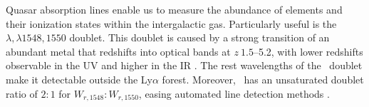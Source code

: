 \documentclass[fleqn,usenatbib]{mnras}
\newcommand{\civ}{\ion{C}{IV}}
\begin{document}
Quasar absorption lines enable %
us to measure the abundance of elements and their ionization states
within the intergalactic gas.
Particularly useful is the \civ\ $\lambda,\lambda1548,1550$ %
doublet.
This doublet is caused by a strong transition of an abundant metal that
redshifts into optical bands at  $z ~ 1.5$--5.2, with lower redshifts observable in the UV \citep[e.g.,][]{C10,shul2014} and higher in the IR \citep[e.g.,][]{simcoeetal13,ryanweber09,beckeretal09}. %
The rest wavelengths of the \civ\ doublet make it
detectable outside the  Ly$\alpha$ forest.
Moreover, \civ\ has an unsaturated doublet
ratio of $2:1$ for $W_{r,1548}:W_{r,1550}$, easing automated
line detection methods \citep{ChurchillBook}.
\end{document}
